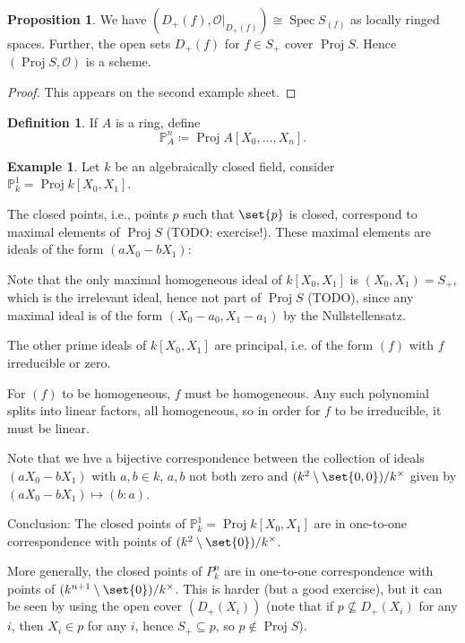 \documentclass[a4paper]{amsbook}
\theoremstyle{definition}
\newtheorem{definition}{Definition}[chapter]
\newtheorem*{example*}{Example}
\newtheorem*{proposition*}{Proposition}
\DeclareMathOperator\Spec{Spec}
\DeclareMathOperator\Proj{Proj}
\begin{document}
\begin{proposition*}
\label{ProjectiveIsScheme}
We have $(D_+(f), \mathcal{O}|_{D_+(f)}) \cong \Spec S_{(f)}$ as locally ringed
spaces. Further, the open sets $D_+(f)$ for $f \in S_+$ cover $\Proj S$. Hence
$(\Proj S, \mathcal{O})$ is a scheme.
\end{proposition*}
\begin{proof}[Proof]
This appears on the second example sheet.
\end{proof}

\begin{definition}
\label{ProjectiveSpace}
If $A$ is a ring, define
\[ \mathbb{P}^n_A\coloneqq \Proj A[X_0, \ldots, X_n]. \]
\end{definition}

\begin{example*}
\label{TwoDimensionalProjective}
Let $k$ be an algebraically closed field, consider $\mathbb{P}_k^1 = \Proj k[X_0, X_1]$.

The closed points, i.e., points $p$ such that $\set{p}$ is closed, correspond to
maximal elements of $\Proj S$ (TODO: exercise!). These maximal elements are ideals
of the form $(aX_0 - bX_1)$:

Note that the only maximal homogeneous ideal of $k[X_0, X_1]$ is $(X_0, X_1) = S_+$,
which is the irrelevant ideal, hence not part of $\Proj S$ (TODO), since
any maximal ideal is of the form $(X_0 - a_0, X_1 - a_1)$ by the Nullstellensatz.

The other prime ideals of $k[X_0, X_1]$ are principal, i.e. of the form
$(f)$ with $f$ irreducible or zero.

For $(f)$ to be homogeneous, $f$ must be homogeneous. Any such polynomial splits
into linear factors, all homogeneous, so in order for $f$ to be irreducible,
it must be linear.

Note that we hve a bijective correspondence between the collection of ideals
$(aX_0 - bX_1)$ with $a, b \in k$, $a, b$ not both zero and
$(k^2\setminus\set{0, 0})/k^\times$ given by $(aX_0 - bX_1)\mapsto (b : a)$.

Conclusion: The closed points of $\mathbb{P}^1_k = \Proj k[X_0, X_1]$ are in one-to-one correspondence
with points of $(k^2\setminus\set{0})/k^\times$.

More generally, the closed points of $P^n_k$ are in one-to-one correspondence with
points of $(k^{n+1}\setminus\set{0})/k^\times$. This is harder (but a good exercise), but it can be seen
by using the open cover $(D_+(X_i))$ (note that if $p \nsubseteq D_+(X_i)$ for any $i$,
then $X_i \in p$ for any $i$, hence $S_+ \subseteq p$, so $p\notin \Proj S$).
\end{example*}
\end{document}
